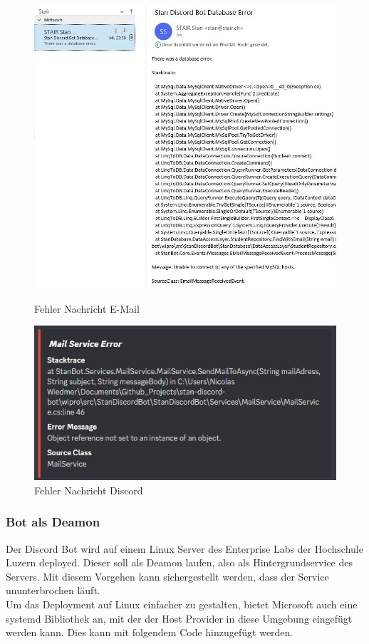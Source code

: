 \documentclass[a4paper, table]{article}
\begin{document}
\begin{figure}[h]
    \begin{minipage}[t]{0.5\textwidth}
        \includegraphics[width=1\textwidth]{img/DatabaseErrorNotificationEmail.png}
        \caption{Fehler Nachricht E-Mail}
    \end{minipage}
    \begin{minipage}[t]{0.5\textwidth}
        \includegraphics[width=1\textwidth]{img/MailErrorNotificationEmbed.png}
        \caption{Fehler Nachricht Discord}
    \end{minipage}
    \label{fig:error-notifications}
\end{figure}

\subsubsection{Bot als Deamon}
Der Discord Bot wird auf einem Linux Server des Enterprise Labs der Hochschule Luzern deployed.
Dieser soll als Deamon laufen, also als Hintergrundservice des Servers.
Mit diesem Vorgehen kann sichergestellt werden, dass der Service ununterbrochen läuft.\\
Um das Deployment auf Linux einfacher zu gestalten, bietet Microsoft auch eine systemd Bibliothek an, 
mit der der Host Provider in diese Umgebung eingefügt werden kann.\autocite{dotnet-bot_systemdhostbuilderextensionsusesystemdihostbuilder_nodate}
Dies kann mit folgendem Code hinzugefügt werden.
\end{document}
